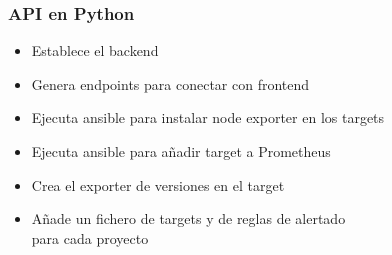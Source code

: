 \begin{frame}[label=python]
    \frametitle{API en Python}
    \begin{itemize}
        \item Establece el backend
        \item Genera endpoints para conectar con frontend
        \item Ejecuta ansible para instalar node exporter en los targets
        \item Ejecuta ansible para añadir target a Prometheus
        \item Crea el exporter de versiones en el target
        \item Añade un fichero de targets y de reglas de alertado\\ para cada proyecto
    \end{itemize}
    
\end{frame}